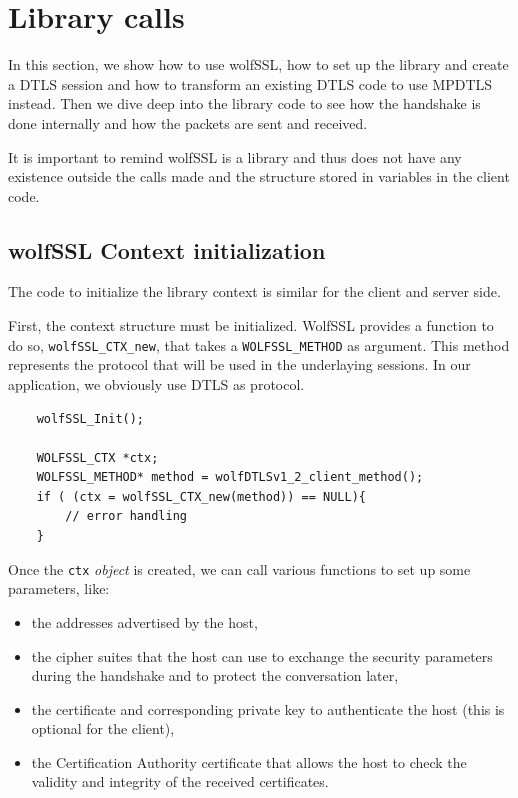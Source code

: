 \section{Library calls}

In this section, we show how to use wolfSSL, how to set up the library and create a DTLS session and how to transform an existing DTLS code to use MPDTLS instead. Then we dive deep into the library code to see how the handshake is done internally and how the packets are sent and received.

It is important to remind wolfSSL is a library and thus does not have any existence outside the calls made and the structure stored in variables in the client code.

\subsection{wolfSSL Context initialization}

The code to initialize the library context is similar for the client and server side.

First, the context structure must be initialized. WolfSSL provides a function to do so, \texttt{wolfSSL\_CTX\_new}, that takes a \texttt{WOLFSSL\_METHOD} as argument. This method represents the protocol that will be used in the underlaying sessions. In our application, we obviously use DTLS as protocol.

\begin{lstlisting}
    wolfSSL_Init();

    WOLFSSL_CTX *ctx;
    WOLFSSL_METHOD* method = wolfDTLSv1_2_client_method();
    if ( (ctx = wolfSSL_CTX_new(method)) == NULL){
        // error handling
    }
\end{lstlisting}

Once the \texttt{ctx} \textit{object} is created, we can call various functions to set up some parameters, like:
\begin{itemize}
\item the addresses advertised by the host,
\item the cipher suites that the host can use to exchange the security parameters during the handshake and to protect the conversation later,
\item the certificate and corresponding private key to authenticate the host (this is optional for the client),
\item the Certification Authority certificate that allows the host to check the validity and integrity of the received certificates.
\end{itemize}

